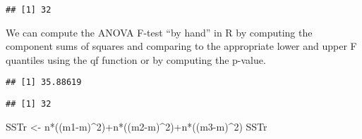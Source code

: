 \documentclass[
]{book}
\newenvironment{Shaded}{\begin{snugshade}}{\end{snugshade}}
\newcommand{\CommentTok}[1]{\textcolor[rgb]{0.56,0.35,0.01}{\textit{#1}}}
\newcommand{\DecValTok}[1]{\textcolor[rgb]{0.00,0.00,0.81}{#1}}
\newcommand{\FunctionTok}[1]{\textcolor[rgb]{0.00,0.00,0.00}{#1}}
\newcommand{\NormalTok}[1]{#1}
\newcommand{\OtherTok}[1]{\textcolor[rgb]{0.56,0.35,0.01}{#1}}
\newcommand{\SpecialCharTok}[1]{\textcolor[rgb]{0.00,0.00,0.00}{#1}}
\begin{document}
\begin{verbatim}
## [1] 32
\end{verbatim}

We can compute the ANOVA F-test ``by hand'' in R by computing the component sums of squares and comparing to the appropriate lower and upper F quantiles using the qf function or by computing the p-value.

\begin{Shaded}
\end{Shaded}

\begin{verbatim}
## [1] 35.88619
\end{verbatim}

\begin{Shaded}
\end{Shaded}

\begin{verbatim}
## [1] 32
\end{verbatim}

\begin{Shaded}
\begin{Highlighting}[]
\NormalTok{SSTr }\OtherTok{\textless{}{-}}\NormalTok{ n}\SpecialCharTok{*}\NormalTok{((m1}\SpecialCharTok{{-}}\NormalTok{m)}\SpecialCharTok{\^{}}\DecValTok{2}\NormalTok{)}\SpecialCharTok{+}\NormalTok{n}\SpecialCharTok{*}\NormalTok{((m2}\SpecialCharTok{{-}}\NormalTok{m)}\SpecialCharTok{\^{}}\DecValTok{2}\NormalTok{)}\SpecialCharTok{+}\NormalTok{n}\SpecialCharTok{*}\NormalTok{((m3}\SpecialCharTok{{-}}\NormalTok{m)}\SpecialCharTok{\^{}}\DecValTok{2}\NormalTok{)}
\NormalTok{SSTr}
\end{Highlighting}
\end{Shaded}
\end{document}
